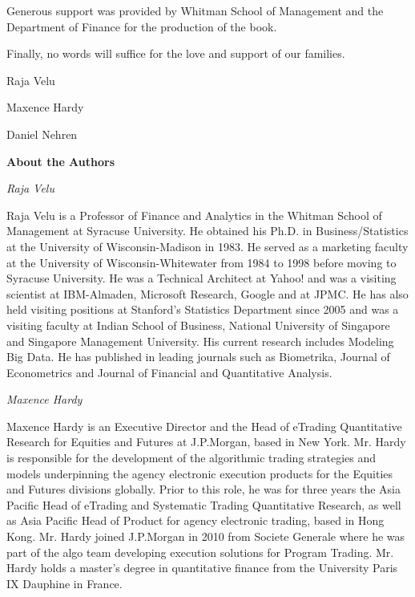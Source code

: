 Generous support was provided by Whitman School of Management and the Department of Finance for the production of the book. 


Finally, no words will suffice for the love and support of our families. \vspace{3\baselineskip}


\noindent Raja Velu \par
\noindent Maxence Hardy \par
\noindent Daniel Nehren



\newpage



{\noindent\Large\bfseries About the Authors} \vspace{1cm}


{\noindent\large\itshape Raja Velu} \medskip

\noindent Raja Velu is a Professor of Finance and Analytics in the Whitman School of Management at Syracuse University. He obtained his Ph.D. in Business/Statistics at the University of Wisconsin-Madison in 1983. He served as a marketing faculty at the University of Wisconsin-Whitewater from 1984 to 1998 before moving to Syracuse University. He was a Technical Architect at Yahoo! and was a visiting scientist at IBM-Almaden, Microsoft Research, Google and at JPMC. He has also held visiting positions at Stanford's Statistics Department since 2005 and was a visiting faculty at Indian School of Business, National University of Singapore and Singapore Management University. His current research includes Modeling Big Data. He has published in leading journals such as Biometrika, Journal of Econometrics and Journal of Financial and Quantitative Analysis. \bigskip


{\noindent\large\itshape Maxence Hardy} \medskip

\noindent Maxence Hardy is an Executive Director and the Head of eTrading Quantitative Research for Equities and Futures at J.P.Morgan, based in New York. Mr. Hardy is responsible for the development of the algorithmic trading strategies and models underpinning the agency electronic execution products for the Equities and Futures divisions globally. Prior to this role, he was for three years the Asia Pacific Head of eTrading and Systematic Trading Quantitative Research, as well as Asia Pacific Head of Product for agency electronic trading, based in Hong Kong. Mr. Hardy joined J.P.Morgan in 2010 from Societe Generale where he was part of the algo team developing execution solutions for Program Trading. Mr. Hardy holds a master's degree in quantitative finance from the University Paris IX Dauphine in France. \bigskip


